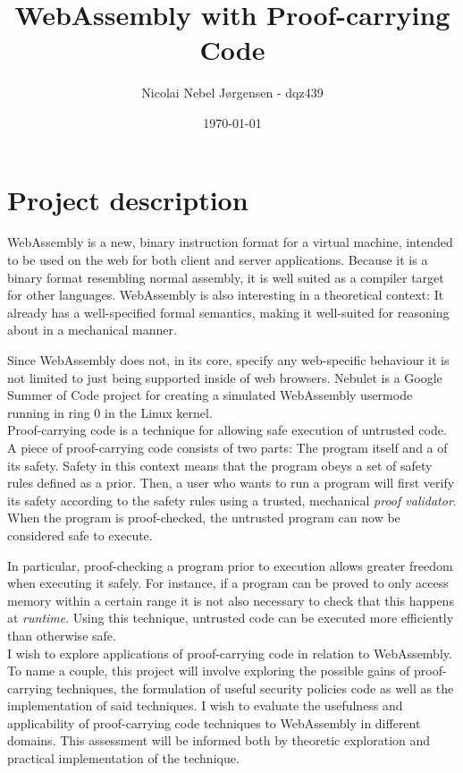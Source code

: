 \documentclass[11pt,a4paper,titlepage]{article}
\title{WebAssembly with Proof-carrying Code}
\author{Nicolai Nebel Jørgensen - dqz439}
\date{\today}
\begin{document}
\maketitle
\newpage

\section*{Project description}
WebAssembly is a new, binary instruction format for a virtual machine, intended
to be used on the web for both client and server applications. Because it is a binary format
resembling normal assembly, it is well suited as a compiler target for other languages.
WebAssembly is also interesting in a theoretical context: It already has a well-specified formal
semantics, making it well-suited for reasoning about in a mechanical manner.

Since WebAssembly does not, in its core, specify any web-specific behaviour it is not limited to
just being supported inside of web browsers. Nebulet\cite{nebulet} is a Google Summer of Code
project for creating a simulated WebAssembly usermode running in ring 0 in the Linux kernel.\\

Proof-carrying code is a technique for allowing safe execution of untrusted code. A piece
of proof-carrying code consists of two parts: The program itself and a  of its safety.
Safety in this context means that the program obeys a set of safety rules defined as a prior.
Then, a user who wants to run a program will first verify its safety according to the safety rules
using a trusted, mechanical \textit{proof validator}. When the program is proof-checked, the untrusted
program can now be considered safe to execute.

In particular, proof-checking a program prior to execution allows greater freedom when executing it safely.
For instance, if a program can be proved to only access memory within a certain range it is not also necessary
to check that this happens at \textit{runtime}. Using this technique, untrusted code can be executed more efficiently
than otherwise safe.\\

I wish to explore applications of proof-carrying code in relation to WebAssembly. To name a couple, this project
will involve exploring the possible gains of proof-carrying techniques,
the formulation of useful security policies code as well as the implementation of said techniques.  
I wish to evaluate the usefulness and applicability of proof-carrying code techniques to WebAssembly in different
domains. This assessment will be informed both by theoretic exploration and practical implementation of the
technique.
\end{document}
